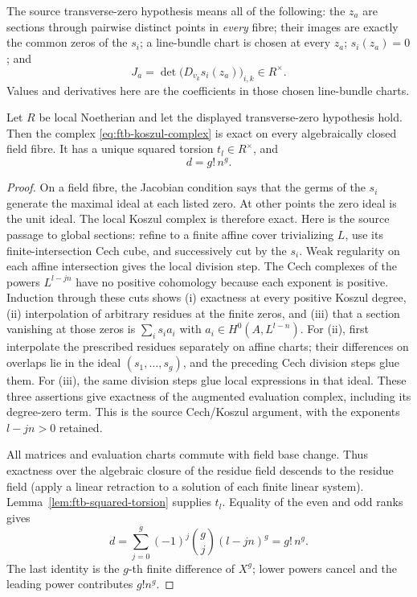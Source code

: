 The source transverse-zero hypothesis means all of the following:
the \(z_a\) are sections through pairwise distinct points in
\emph{every} fibre; their images are exactly the common zeros of
the \(s_i\); a line-bundle chart is chosen at every \(z_a\);
\(s_i(z_a)=0\); and
\[
 J_a=\det\bigl(D_{v_k}s_i(z_a)\bigr)_{i,k}
                 \in R^\times .                   \tag{K3}\label{eq:ftb-jac-unit}
\]
Values and derivatives here are the coefficients in those chosen
line-bundle charts.

\begin{srlemma}\label{lem:ftb-koszul-unit}
Let \(R\) be local Noetherian and let the displayed transverse-zero
hypothesis hold.  Then the complex
\eqref{eq:ftb-koszul-complex} is exact on every algebraically closed
field fibre.  It has a unique squared torsion \(t_l\in R^\times\),
and
\[
                     d=g!\,n^g.                   \tag{K4}\label{eq:ftb-zero-count}
\]
\end{srlemma}
\begin{proof}
On a field fibre, the Jacobian condition says that the germs of the
\(s_i\) generate the maximal ideal at each listed zero.
At other points the zero ideal is the unit ideal.
The local Koszul complex is therefore exact.
Here is the source passage to global sections: refine to a finite
affine cover trivializing \(L\), use its finite-intersection Cech
cube, and successively cut by the \(s_i\).
Weak regularity on each affine intersection gives the local
division step.  The Cech complexes of the powers
\(L^{l-jn}\) have no positive cohomology because each exponent is
positive.  Induction through these cuts shows (i) exactness at every
positive Koszul degree, (ii) interpolation of arbitrary residues at
the finite zeros, and (iii) that a section vanishing at those zeros
is \(\sum_i s_i a_i\) with \(a_i\in H^0(A,L^{l-n})\).
For (ii), first interpolate the prescribed residues separately on
affine charts; their differences on overlaps lie in the ideal
\((s_1,\ldots,s_g)\), and the preceding Cech division steps glue
them.  For (iii), the same division steps glue local expressions
in that ideal.  These three assertions give exactness of the
augmented evaluation complex, including its degree-zero term.
This is the source Cech/Koszul argument, with the exponents
\(l-jn>0\) retained.

All matrices and evaluation charts commute with field base change.
Thus exactness over the algebraic closure of the residue field
descends to the residue field (apply a linear retraction to a
solution of each finite linear system).
Lemma~\ref{lem:ftb-squared-torsion} supplies \(t_l\).
Equality of the even and odd ranks gives
\[
 d=\sum_{j=0}^g(-1)^j\binom gj(l-jn)^g=g!\,n^g.
\]
The last identity is the \(g\)-th finite difference of \(X^g\);
lower powers cancel and the leading power contributes \(g!n^g\).
\end{proof}

